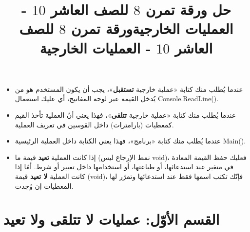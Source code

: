 \documentclass[14pt]{extarticle}
\title{حل ورقة تمرن $8$ للصف العاشر $10$ - العمليات الخارجية}
\title{ورقة تمرن $8$ للصف العاشر $10$ - العمليات الخارجية}
\begin{document}
\maketitle
\thispagestyle{fancy}

\begin{boxAttention}
\begin{itemize}
    \item عندما يُطلب منك كتابة «عملية خارجية \textbf{تستقبل}»، يجب أن يكون المستخدم هو من يُدخل القيمة عبر لوحة المفاتيح، أي عليك استعمال \textenglish{Console.ReadLine()}.
    \item عندما يُطلب منك كتابة «عملية خارجية \textbf{تتلقى}»، فهذا يعني أنّ العملية تأخذ القيم كمعطيات (بارامترات) داخل القوسين في تعريف العملية.
    \item عندما يُطلب منك كتابة «برنامج»، فهذا يعني الكتابة داخل العملية الرئيسية \textenglish{Main()}.
    \item إذا كانت العملية \textbf{تعيد} قيمة ما (نمط الإرجاع ليس \textenglish{void})، فعليك حفظ القيمة المعادة في متغير عند استدعائها، أو طباعتها، أو استخدامها داخل تعبير أو شرط. أمّا إذا كانت العملية \textbf{لا تعيد} قيمة (\textenglish{void})، فإنّك تكتب اسمها فقط عند استدعائها وتمرّر لها المعطيات إن وُجدت.
\end{itemize}
\end{boxAttention}

\section*{القسم الأوّل: عمليات لا تتلقى ولا تعيد}
\end{document}
